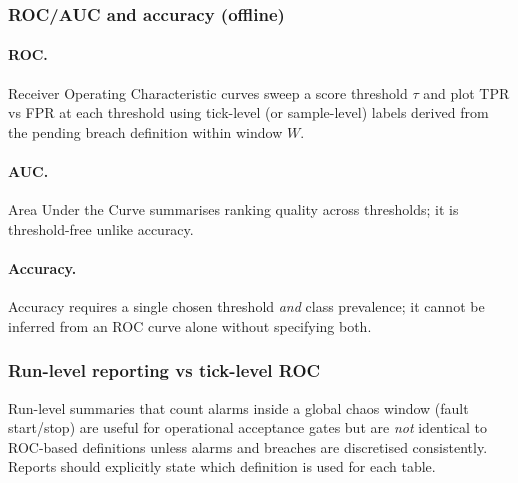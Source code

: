 \documentclass[sigconf]{acmart}
\begin{document}
\subsubsection*{ROC/AUC and accuracy (offline)}

\paragraph{ROC.}
Receiver Operating Characteristic curves sweep a score threshold $\tau$ and plot TPR vs FPR at each threshold using tick-level (or sample-level) labels derived from the pending breach definition within window $W$.

\paragraph{AUC.}
Area Under the Curve summarises ranking quality across thresholds; it is threshold-free unlike accuracy.

\paragraph{Accuracy.}
Accuracy requires a single chosen threshold \emph{and} class prevalence; it cannot be inferred from an ROC curve alone without specifying both.

\subsubsection*{Run-level reporting vs tick-level ROC}

Run-level summaries that count alarms inside a global chaos window (fault start/stop) are useful for operational acceptance gates but are \emph{not} identical to ROC-based definitions unless alarms and breaches are discretised consistently. Reports should explicitly state which definition is used for each table.





\end{document}
